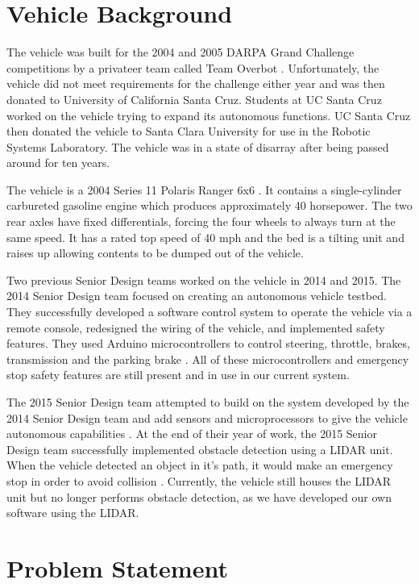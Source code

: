 \section{Vehicle Background}
The vehicle was built for the 2004 and 2005 DARPA Grand Challenge competitions by a privateer team called Team Overbot \cite{rslrover2014}.  Unfortunately, the vehicle did not meet requirements for the challenge either year and was then donated to University of California Santa Cruz.  Students at UC Santa Cruz worked on the vehicle trying to expand its autonomous functions.   UC Santa Cruz then donated the vehicle to Santa Clara University for use in the Robotic Systems Laboratory.  The vehicle was in a state of disarray after being passed around for ten years.  

The vehicle is a 2004 Series 11 Polaris Ranger 6x6 \cite{rslrover2014}.  It contains a single-cylinder carbureted gasoline engine which produces approximately 40 horsepower.  The two rear axles have fixed differentials, forcing the four wheels to always turn at the same speed.  It has a rated top speed of 40 mph and the bed is a tilting unit and raises up allowing contents to be dumped out of the vehicle.  

Two previous Senior Design teams worked on the vehicle in 2014 and 2015.  The 2014 Senior Design team focused on creating an autonomous vehicle testbed.  They successfully developed a software control system to operate the vehicle via a remote console, redesigned the wiring of the vehicle, and implemented safety features.  They used Arduino microcontrollers to control steering, throttle, brakes, transmission and the parking brake \cite{rslrover2014}.  All of these microcontrollers and emergency stop safety features are still present and in use in our current system.

The 2015 Senior Design team attempted to build on the system developed by the 2014 Senior Design team and add sensors and microprocessors to  give the vehicle autonomous capabilities \cite{rslrover2015}.  At the end of their year of work, the 2015 Senior Design team successfully implemented obstacle detection using a LIDAR unit.  When the vehicle detected an object in it's path, it would make an emergency stop in order to avoid collision \cite{rslrover2015}. Currently, the vehicle still houses the LIDAR unit but no longer performs obstacle detection, as we have developed our own software using the LIDAR. 

\section{Problem Statement}


